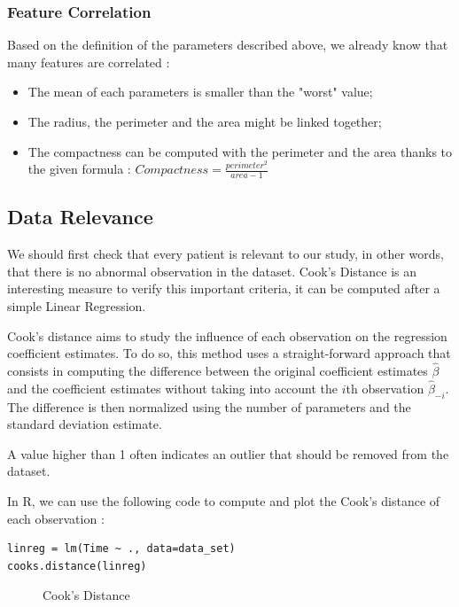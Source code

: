 \documentclass[]{report}
\begin{document}
\subsubsection{Feature Correlation}
Based on the definition of the parameters described above, we already know that many features are correlated :
\begin{itemize}
	\item The mean of each parameters is smaller than the "worst" value;
	\item The radius, the perimeter and the area might be linked together;
	\item The compactness can be computed with the perimeter and the area thanks to the given formula : $Compactness = \frac{perimeter^2}{area - 1}$
\end{itemize}

\subsection{Data Relevance}
We should first check that every patient is relevant to our study, in other words, that there is no abnormal observation in the dataset. Cook's Distance is an interesting measure to verify this important criteria, it can be computed after a simple Linear Regression.

Cook's distance aims to study the influence of each observation on the regression coefficient estimates. To do so, this method uses a straight-forward approach that consists in computing the difference between the original coefficient estimates $\hat{\beta}$ and the coefficient estimates without taking into account the $i$th observation $\hat{\beta}_{-i}$. The difference is then normalized using the number of parameters and the standard deviation estimate. 

A value higher than 1 often indicates an outlier that should be removed from the dataset.

In R, we can use the following code to compute and plot the Cook's distance of each observation :

\begin{lstlisting}
linreg = lm(Time ~ ., data=data_set)
cooks.distance(linreg)
\end{lstlisting} 

\begin{figure}[!hb]
	\centering
	
	\caption{Cook's Distance}
	\label{fig:cook_distance}
\end{figure}
\end{document}

